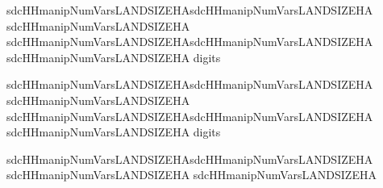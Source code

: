 \documentclass[letterpaper,10pt,english]{sphinxmanual}
\begin{document}
\def\sphinxLiteralBlockLabel{\label{\detokenize{case_studies:code918}}}
%
\begin{sphinxVerbatim}[commandchars=\\\{\},numbers=left,firstnumber=1,stepnumber=1]
sdcHHmanipNumVarsLANDSIZEHA\PYG{p}{[}sdcHHmanipNumVarsLANDSIZEHA   
                              sdcHHmanipNumVarsLANDSIZEHA\PYG{p}{]} 
             sdcHHmanipNumVarsLANDSIZEHA\PYG{p}{[}sdcHHmanipNumVarsLANDSIZEHA   
                                                 sdcHHmanipNumVarsLANDSIZEHA\PYG{p}{]}
                   digits  

sdcHHmanipNumVarsLANDSIZEHA\PYG{p}{[}sdcHHmanipNumVarsLANDSIZEHA   
                              sdcHHmanipNumVarsLANDSIZEHA\PYG{p}{]} 
             sdcHHmanipNumVarsLANDSIZEHA\PYG{p}{[}sdcHHmanipNumVarsLANDSIZEHA   
                                                 sdcHHmanipNumVarsLANDSIZEHA\PYG{p}{]}
                   digits  

sdcHHmanipNumVarsLANDSIZEHA\PYG{p}{[}sdcHHmanipNumVarsLANDSIZEHA   
sdcHHmanipNumVarsLANDSIZEHA    sdcHHmanipNumVarsLANDSIZEHA\PYG{p}{]}  


\end{sphinxVerbatim}
\end{document}
